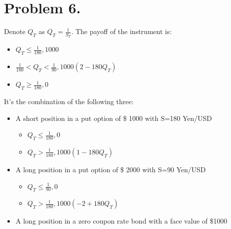 \documentclass{article}
\begin{document}
\section{Problem 6.}
Denote $Q_T$ as $Q_T = \frac{1}{S_T}$. The payoff of the instrument is:
\begin{itemize}
  \item $Q_T\leq \frac{1}{180}, 1000$
  \item $\frac{1}{180} < Q_T < \frac{1}{90}, 1000(2-180Q_T)$
  \item $Q_T\geq \frac{1}{180}, 0$
\end{itemize}
It's the combination of the following three:
\begin{itemize}
  \item A short position in a put option of \$ 1000 with S=180 Yen/USD
  \begin{itemize}
    \item $Q_T\leq\frac{1}{180},0$
    \item $Q_T>\frac{1}{180}, 1000(1-180Q_T)$
  \end{itemize}
  \item A long position in a put option of \$ 2000 with S=90 Yen/USD
  \begin{itemize}
    \item $Q_T\leq\frac{1}{90},0$
    \item $Q_T>\frac{1}{180}, 1000(-2+180Q_T)$
  \end{itemize}
  \item A long position in a zero coupon rate bond with a face value of \$1000
\end{itemize}
\end{document}
